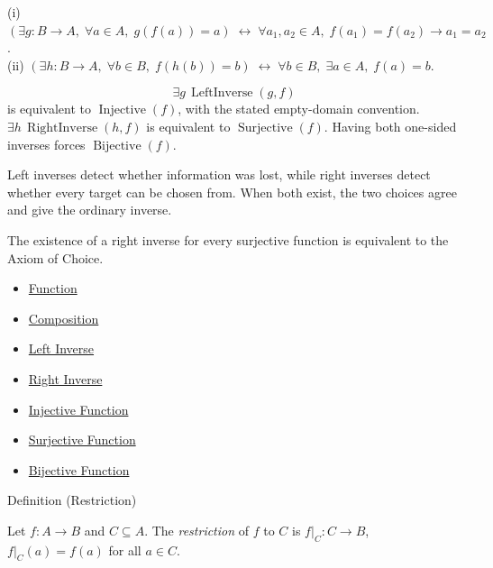 \begin{remark*}
(i) $(\exists g: B\to A,\; \forall a\in A,\; g(f(a))=a) \;\leftrightarrow\; \forall a_1,a_2\in A,\; f(a_1)=f(a_2)\to a_1=a_2$.\\
(ii) $(\exists h: B\to A,\; \forall b\in B,\; f(h(b))=b) \;\leftrightarrow\; \forall b\in B,\; \exists a\in A,\; f(a)=b$.
\end{remark*}

\begin{remark*}
\[
  \exists g\,\operatorname{LeftInverse}(g,f)
\] is equivalent to
$\operatorname{Injective}(f)$, with the stated empty-domain convention.
$\exists h\,\operatorname{RightInverse}(h,f)$ is equivalent to
$\operatorname{Surjective}(f)$. Having both one-sided inverses forces
$\operatorname{Bijective}(f)$.
\end{remark*}

\begin{remark*}[Interpretation]
Left inverses detect whether information was lost, while right inverses detect
whether every target can be chosen from. When both exist, the two choices agree
and give the ordinary inverse.
\end{remark*}

\begin{remark*}[Exposition]
The existence of a right inverse for every surjective function is equivalent
to the Axiom of Choice.
\end{remark*}

\begin{dependencies}
\begin{itemize}
  \item \hyperref[def:function]{Function}
  \item \hyperref[def:composition]{Composition}
  \item \hyperref[def:left-inverse-function]{Left Inverse}
  \item \hyperref[def:right-inverse-function]{Right Inverse}
  \item \hyperref[def:injective]{Injective Function}
  \item \hyperref[def:surjective]{Surjective Function}
  \item \hyperref[def:bijective]{Bijective Function}
\end{itemize}
\end{dependencies}

\begin{definitionbox}{Definition (Restriction)}
\begin{definition}[Restriction]\label{def:restriction}
Let $f : A \to B$ and $C \subseteq A$. The \emph{restriction} of $f$ to $C$
is $f|_C : C \to B$, $f|_C(a) = f(a)$ for all $a \in C$.
\end{definition}
\end{definitionbox}

